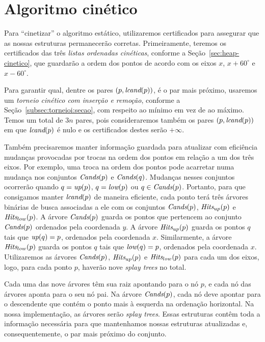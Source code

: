 
\FloatBarrier


\section{Algoritmo cinético}\label{sec:algoritmo-cinetico}

Para ``cinetizar'' o algoritmo estático, utilizaremos certificados para assegurar que as nossas
estruturas permanecerão corretas.
Primeiramente, teremos os certificados das três \textit{listas ordenadas cinéticas}, conforme a
Seção~\ref{sec:heap-cinetico}, que guardarão a ordem dos pontos de acordo com os eixos $x$, $x +
60^\circ$ e $x - 60^\circ$.

Para garantir qual, dentre os pares $(p, \textit{lcand}(p))$, é o par mais próximo, usaremos um
\textit{torneio cinético com inserção e remoção}, conforme a Seção~\ref{subsec:torneioi:secao},
com respeito ao mínimo em vez de ao máximo.
Temos um total de $3n$ pares, pois consideraremos também os pares $(p, \textit{lcand}(p))$ em que
$\textit{lcand}(p)$ é nulo e os certificados destes serão $+\infty$.

Também precisaremos manter informação guardada para atualizar com eficiência mudanças provocadas
por trocas na ordem dos pontos em relação a um dos três eixos.
Por exemplo, uma troca na ordem dos pontos pode acarretar numa mudança nos conjuntos $\textit{Cands}(p)$ e
$\textit{Cands}(q)$.
Mudanças nesses conjuntos ocorrerão quando $q = \textit{up}(p)$, $q = \textit{low}(p)$ ou $q \in \textit{Cands}(p)$.
Portanto, para que consigamos manter $\textit{lcand}(p)$ de maneira eficiente, cada ponto terá três árvores
binárias de busca associadas a ele com os conjuntos $\textit{Cands}(p)$, $\textit{Hits}_{up}(p)$ e $\textit{Hits}_{low}(p)
$.
A árvore $\textit{Cands}(p)$ guarda os pontos que pertencem ao conjunto $\textit{Cands}(p)$ ordenados pela
coordenada $y$.
A árvore $\textit{Hits}_{up}(p)$ guarda os pontos $q$ tais que $\textit{up}(q) = p$, ordenados pela coordenada $x$.
Similarmente, a árvore $\textit{Hits}_{low}(p)$ guarda os pontos $q$ tais que $\textit{low}(q) = p$, ordenados
pela coordenada $x$.
Utilizaremos as árvores $\textit{Cands}(p)$, $\textit{Hits}_{up}(p)$ e $\textit{Hits}_{low}(p)$ para cada um dos eixos,
logo, para cada ponto $p$, haverão nove \textit{splay trees} no total.

Cada uma das nove árvores têm sua raiz apontando para o nó $p$, e cada nó das árvores aponta para
o seu nó pai.
Na árvore $\textit{Cands}(p)$, cada nó deve apontar para o descendente que contém o ponto mais à esquerda
na ordenação horizontal.
Na nossa implementação, as árvores serão \textit{splay trees}.
Essas estruturas contêm toda a informação necessária para que mantenhamos nossas estruturas
atualizadas e, consequentemente, o par mais próximo do conjunto.

